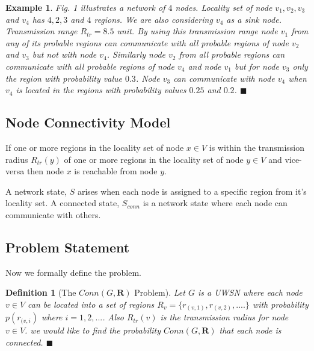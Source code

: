 \documentclass[12pt]{article}
\newtheorem*{defi}{Definition}
\newtheorem{exmp}{Example}[section]
\begin{document}
\begin{exmp}
\normalfont
Fig. 1 illustrates a network of $4$ nodes. Locality set of node $v_1,v_2,v_3$ and $v_4$ has $4,2,3$ and $4$ regions. We are also considering $v_4$ as a sink node. Transmission range \(R_{tr}=8.5\) unit. By using this transmission range node $v_1$ from any of its probable regions can communicate with all probable regions of node $v_2$ and $v_3$ but not with node $v_4$. Similarly node $v_2$ from all probable regions can communicate with all probable regions of node $v_4$ and node $v_1$ but for node $v_3$ only the region with probability value $0.3$. Node $v_3$ can communicate with node $v_4$ when $v_4$ is located in the regions with probability values $0.25$ and $0.2$. $\blacksquare$

\end{exmp}
 \subsection{Node Connectivity Model}
If one or more regions in the locality set of node $x\in V$ is within the transmission radius $R_{tr}(y)$ of one or more regions in the locality set of node $y\in V$ and vice-versa then node $x$ is reachable from node $y$.


A network state, $S$ arises when each node is assigned to a specific region from it's locality set. A connected state, $S_{conn}$ is a network state where each node can communicate with others.
\subsection{Problem Statement}
Now we formally define the problem.
\begin{defi}[The $Conn(G,\textbf{R})$ Problem]
\normalfont
Let $G$ is a UWSN where each node $v\in V$ can be located into a set of regions  $R_v=\{r_{(v,1)},r_{(v,2)},....\}$  with probability $p(r_{(v,i})$ where $i=1,2,...$. Also $R_{tr}(v)$ is the transmission radius for node $v\in V$. we would like to find the probability $Conn(G,\textbf{R})$ that each node is connected. $\blacksquare$
\end{defi}
\end{document}
